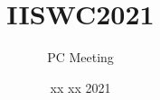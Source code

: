 \documentclass{beamer}
\title{IISWC2021}
\subtitle{PC Meeting}
\date{xx xx 2021}
\begin{document}
  \begin{frame}
    \maketitle
  \end{frame}

\end{document}
